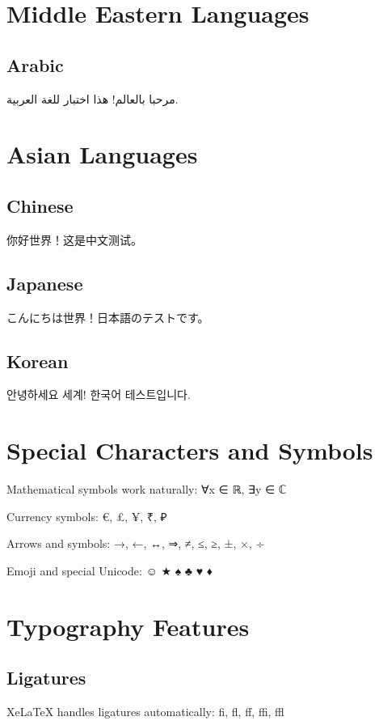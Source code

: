 \documentclass[12pt,a4paper]{article}
\begin{document}
\section{Middle Eastern Languages}

\subsection{Arabic}
\begin{arabic}
مرحبا بالعالم! هذا اختبار للغة العربية.
\end{arabic}

\section{Asian Languages}

\subsection{Chinese}
你好世界！这是中文测试。

\subsection{Japanese}
こんにちは世界！日本語のテストです。

\subsection{Korean}
안녕하세요 세계! 한국어 테스트입니다.

\section{Special Characters and Symbols}

Mathematical symbols work naturally: ∀x ∈ ℝ, ∃y ∈ ℂ

Currency symbols: €, £, ¥, ₹, ₽

Arrows and symbols: →, ←, ↔, ⇒, ≠, ≤, ≥, ±, ×, ÷

Emoji and special Unicode: ☺ ★ ♠ ♣ ♥ ♦

\section{Typography Features}

\subsection{Ligatures}
XeLaTeX handles ligatures automatically: fi, fl, ff, ffi, ffl
\end{document}
